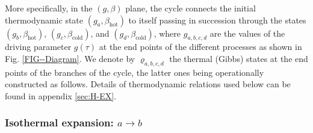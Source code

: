 \documentclass[aps,pra,floatfix,twocolumn,groupedaddress,superscriptaddress,nofootinbib,notitlepage,amsmath,amssymb,]{revtex4-1}
\begin{document}
More specifically, in the $(g,\beta)$ plane, the cycle connects the initial thermodynamic state $(g_a,\beta_{\mathrm{hot}})$ to itself passing in succession through the states $(g_b,\beta_{\mathrm{hot}})$, $(g_c,\beta_{\mathrm{cold}})$, and $(g_d,\beta_{\mathrm{cold}})$, where $g_{a,b,c,d}$ are the values of the driving parameter $g(\tau)$ at the end points of the different processes as shown in Fig. \ref{FIG--Diagram}. We denote by $\varrho_{a,b,c,d}$ the thermal (Gibbs) states at the end points of the branches of the cycle, the latter ones being operationally constructed as follows. Details of thermodynamic relations used below can be found in appendix \ref{sec:H-EX}.

\subsubsection{Isothermal expansion: $a\rightarrow b$}
\end{document}
